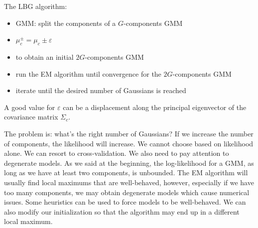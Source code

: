 The LBG algorithm:
\begin{itemize}
	\item GMM: split the components of a $G$-components GMM
	\item $\mu_c^\pm = \mu_c \pm \varepsilon$
	\item to obtain an initial $2G$-components GMM
	\item run the EM algorithm until convergence for the $2G$-components GMM
	\item iterate until the desired number of Gaussians is reached
\end{itemize}

A good value for $\varepsilon$ can be a displacement along the principal eigenvector of the covariance matrix $\Sigma_c$.

The problem is: what's the right number of Gaussians? If we increase the number of components, the likelihood will increase. We cannot choose based on likelihood alone. We can resort to cross-validation. We also need to pay attention to degenerate models. As we said at the beginning, the log-likelihood for a GMM, as long as we have at least two components, is unbounded. The EM algorithm will usually find local maximums that are well-behaved, however, especially if we have too many components, we may obtain degenerate models which cause numerical issues. Some heuristics can be used to force models to be well-behaved. We can also modify our initialization so that the algorithm may end up in a different local maximum.
